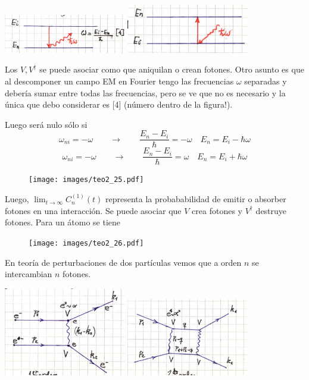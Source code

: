\documentclass[10pt,oneside]{CBFT_book}
\begin{document}
\includegraphics[width=0.4\textwidth]{images/fig_ft2_perturbativos_2a.jpg}
\includegraphics[width=0.4\textwidth]{images/fig_ft2_perturbativos_2b.jpg}

Los $V,V^\dagger$ se puede asociar como que aniquilan o crean fotones.
Otro asunto es que al descomponer un campo EM en Fourier tengo las frecuencias $\omega$ separadas
y debería sumar entre todas las frecuencias, pero se ve que no es necesario y la única que debo
considerar es [4] (número dentro de la figura!).

Luego será nulo sólo si 
\[
	\omega_{ni} = -\omega \qquad \longrightarrow \qquad 
		\frac{E_n - E_i}{\hbar} = -\omega \quad E_n = E_i - \hbar\omega
\]
\[
	\omega_{ni} = -\omega \qquad \longrightarrow \qquad 
		\frac{E_n - E_i}{\hbar} = \omega \quad E_n = E_i + \hbar\omega
\]

\begin{figure}[htb]
	\begin{center}
	\texttt{[image: images/teo2\_25.pdf]}
	\end{center}
	\caption{}
\end{figure} 

Luego, $ \lim_{t\to\infty} C_n^{(1)}(t) $ representa la probababilidad de emitir o absorber 
fotones en una interacción. Se puede asociar que $V$ crea fotones y $V^\dagger$ destruye fotones. 
Para un átomo se tiene 

\begin{figure}[htb]
	\begin{center}
	\texttt{[image: images/teo2\_26.pdf]}
	\end{center}
	\caption{}
\end{figure} 

En teoría de perturbaciones de dos partículas vemos que a orden $n$ se intercambian $n$ fotones.

\includegraphics[width=0.4\textwidth]{images/fig_ft2_perturbativos_3a.jpg}
\includegraphics[width=0.4\textwidth]{images/fig_ft2_perturbativos_3b.jpg}
\end{document}

